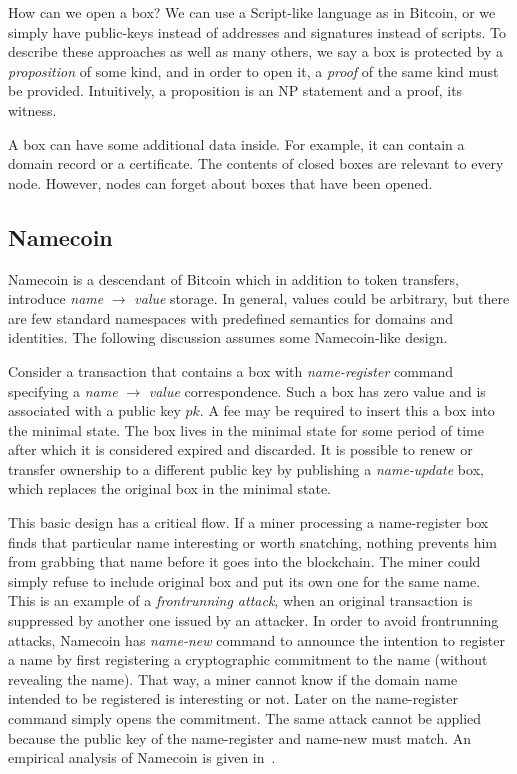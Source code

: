 \documentclass[]{report}   %
\begin{document}
How can we open a box? 
We can use a Script-like language as in Bitcoin, or we simply have public-keys instead of addresses and signatures instead of scripts. To describe these approaches as well as many others, we say a box is protected by a \textit{proposition} of some kind, and in order to open it, a \textit{proof} of the same kind must be provided. %
Intuitively, a proposition is an NP statement and a proof, its witness.

A box can have some additional data inside. For example, it can contain a domain record or a certificate. The contents of closed boxes are relevant to every node. However, nodes can forget about boxes that have been opened.

\subsection{Namecoin}

Namecoin is a descendant of Bitcoin which in addition to token transfers, introduce \textit{name} $\rightarrow$ \textit{value} storage. In general, values could be arbitrary, but there are few  standard namespaces with predefined semantics for domains and identities.
The following discussion assumes some Namecoin-like design. 

Consider a transaction that contains a box with {\em name-register} command specifying a \textit{name} $\rightarrow$ \textit{value} correspondence. Such a box has zero value and is associated with a public key \(pk\). A fee may be required to insert this a box into the minimal state. The box lives in the minimal state for some period of time after which it is considered expired and discarded. It is possible to renew or transfer ownership to a different public key by publishing a \textit{name-update} box, which replaces the original box in the minimal state.

This basic design has a critical flow. If a miner processing a name-register box finds that particular name interesting or worth snatching, nothing prevents him from grabbing that name before it goes into the blockchain. The miner could simply refuse to include original box and put its own one for the same name. This is an example of a
\textit{frontrunning attack}, when an original transaction is suppressed by another one issued by an attacker. In order to avoid frontrunning attacks, Namecoin has \textit{name-new} command to announce the intention to register a name by first registering a cryptographic commitment to the name (without revealing the name). That way, a miner cannot know if the domain name intended to be registered is interesting or not. Later on the name-register command simply opens the commitment. The same attack cannot be applied because the public key of the name-register and name-new must match. An empirical analysis of Namecoin is given in~\cite{kalodner2015empirical}.
\end{document}
